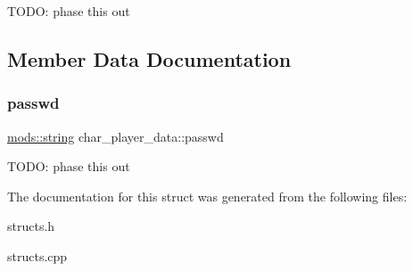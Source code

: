T\+O\+DO\+: phase this out 

\subsection{Member Data Documentation}
\mbox{\label{structchar__player__data_a12af4ba80fd0d983e080dda62ac8522c}} 
\subsubsection{\texorpdfstring{passwd}{passwd}}
{\footnotesize\ttfamily \hyperlink{structmods_1_1string}{mods\+::string} char\+\_\+player\+\_\+data\+::passwd}

T\+O\+DO\+: phase this out 

The documentation for this struct was generated from the following files\+:\begin{DoxyCompactItemize}
\item 
structs.\+h\item 
structs.\+cpp\end{DoxyCompactItemize}
